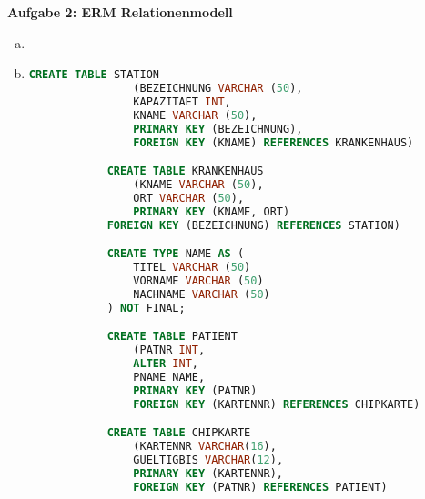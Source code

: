 \documentclass[a4paper,12pt]{article}
\newcommand{\Aufgabe}[1]{
        {
        \vspace*{0.5cm}
        \textbf{Aufgabe #1}
        \vspace*{0.2cm}
    }
}
\begin{document}
    \Aufgabe{2: ERM \textrightarrow Relationenmodell}
    \begin{enumerate}[(a)]
        \item
        \newpage
        \item
        \begin{lstlisting}[language=SQL]
            CREATE TABLE STATION
                (BEZEICHNUNG VARCHAR (50),
                KAPAZITAET INT,
                KNAME VARCHAR (50),
                PRIMARY KEY (BEZEICHNUNG),
                FOREIGN KEY (KNAME) REFERENCES KRANKENHAUS)

            CREATE TABLE KRANKENHAUS
                (KNAME VARCHAR (50),
                ORT VARCHAR (50),
                PRIMARY KEY (KNAME, ORT)
            FOREIGN KEY (BEZEICHNUNG) REFERENCES STATION)

            CREATE TYPE NAME AS (
                TITEL VARCHAR (50)
                VORNAME VARCHAR (50)
                NACHNAME VARCHAR (50)
            ) NOT FINAL;

            CREATE TABLE PATIENT
                (PATNR INT,
                ALTER INT,
                PNAME NAME,
                PRIMARY KEY (PATNR)
                FOREIGN KEY (KARTENNR) REFERENCES CHIPKARTE)

            CREATE TABLE CHIPKARTE
                (KARTENNR VARCHAR(16),
                GUELTIGBIS VARCHAR(12),
                PRIMARY KEY (KARTENNR),
                FOREIGN KEY (PATNR) REFERENCES PATIENT)

        \end{lstlisting}
    \end{enumerate}

\end{document}
